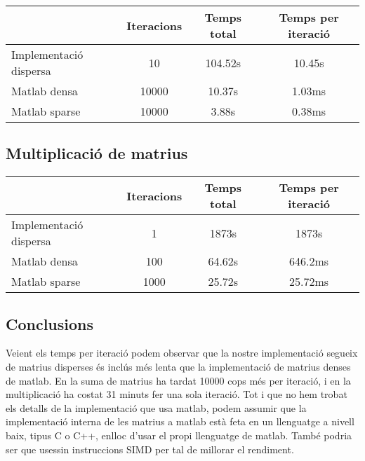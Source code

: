 \documentclass[11pt,a4paper,twoside]{report}
\begin{document}
\begin{center}
    \begin{tabular}{| l | c| c | c |}
      \hline
       & Iteracions & Temps total & Temps per iteració \\ \hline

      Implementació dispersa & 10 & 104.52s & 10.45s \\ \hline
       Matlab densa & 10000 & 10.37s & 1.03ms \\ \hline
       Matlab sparse & 10000 & 3.88s & 0.38ms \\
      \hline
    \end{tabular}
  \end{center}

\subsection{Multiplicació de matrius}

\begin{center}
    \begin{tabular}{| l | c| c | c |}
      \hline
       & Iteracions & Temps total & Temps per iteració \\ \hline

      Implementació dispersa & 1 & 1873s & 1873s \\ \hline
       Matlab densa & 100 & 64.62s & 646.2ms \\ \hline
       Matlab sparse & 1000 & 25.72s & 25.72ms \\
      \hline
    \end{tabular}
  \end{center}

\subsection{Conclusions}

Veient els temps per iteració podem observar que la nostre implementació segueix de matrius disperses és inclús més lenta que la implementació de matrius denses de matlab. En la suma de matrius ha tardat 10000 cops més per iteració, i en la multiplicació ha costat 31 minuts fer una sola iteració.
Tot i que no hem trobat els detalls de la implementació que usa matlab, podem assumir que la implementació interna de les matrius a matlab està feta en un llenguatge a nivell baix, tipus C o C++, enlloc d'usar el propi llenguatge de matlab.
També podria ser que usessin instruccions SIMD per tal de millorar el rendiment.
\end{document}
